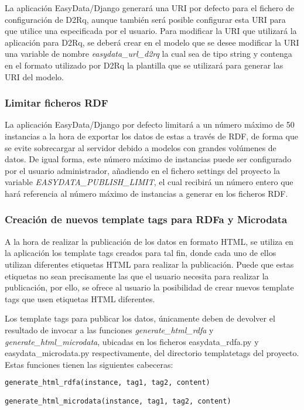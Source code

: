 La aplicación EasyData/Django generará una URI por defecto para el fichero de
configuración de D2Rq, aunque también será posible configurar esta URI para que
utilice una especificada por el usuario. Para modificar la URI que utilizará la
aplicación para D2Rq, se deberá crear en el modelo que se desee modificar la URI
una variable de nombre \textit{easydata\_url\_d2rq} la cual sea de tipo string y
contenga en el formato utilizado por D2Rq la plantilla que se utilizará para
generar las URI del modelo.

\subsubsection{Limitar ficheros RDF}

La aplicación EasyData/Django por defecto limitará a un número máximo de 50
instancias a la hora de exportar los datos de estas a través de RDF, de forma
que se evite sobrecargar al servidor debido a modelos con grandes volúmenes de
datos. De igual forma, este número máximo de instancias puede ser configurado
por el usuario administrador, añadiendo en el fichero settings del proyecto la
variable \textit{EASYDATA\_PUBLISH\_LIMIT}, el cual recibirá un número entero
que hará referencia al número máximo de instancias a generar en los ficheros
RDF.

\subsubsection{Creación de nuevos template tags para RDFa y Microdata}

A la hora de realizar la publicación de los datos en formato HTML, se utiliza en
la aplicación los template tags creados para tal fin, donde cada uno de ellos
utilizan diferentes etiquetas HTML para realizar la publicación. Puede que estas
etiquetas no sean precisamente las que el usuario necesita para realizar la
publicación, por ello, se ofrece al usuario la posibilidad de crear nuevos
template tags que usen etiquetas HTML diferentes.

Los template tags para publicar los datos, únicamente deben de devolver el
resultado de invocar a las funciones \textit{generate\_html\_rdfa} y
\textit{generate\_html\_microdata}, ubicadas en los ficheros easydata\_rdfa.py y
easydata\_microdata.py respectivamente, del directorio templatetags del proyecto.
Estas funciones tienen las siguientes cabeceras:

\begin{lstlisting}[frame=L, language=Python, basicstyle=\footnotesize]
generate_html_rdfa(instance, tag1, tag2, content)

generate_html_microdata(instance, tag1, tag2, content)
\end{lstlisting}

